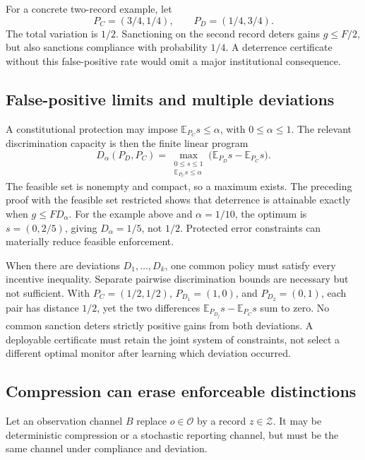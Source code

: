 \documentclass[11pt,letterpaper]{article}
\theoremstyle{plain}
\theoremstyle{definition}
\theoremstyle{remark}
\newcommand{\E}{\mathbb E}
\begin{document}
For a concrete two-record example, let
\[
P_C=(3/4,1/4),\qquad P_D=(1/4,3/4).
\]
The total variation is $1/2$. Sanctioning on the second record deters gains $g\leq F/2$, but also sanctions compliance with probability $1/4$. A deterrence certificate without this false-positive rate would omit a major institutional consequence.

\subsection{False-positive limits and multiple deviations}
A constitutional protection may impose $\E_{P_C}s\leq\alpha$, with $0\leq\alpha\leq1$. The relevant discrimination capacity is then the finite linear program
\begin{equation}\label{eq:protected-discrimination}
D_\alpha(P_D,P_C)=
\max_{\substack{0\leq s\leq1\\\E_{P_C}s\leq\alpha}}
\bigl(\E_{P_D}s-\E_{P_C}s\bigr).
\end{equation}
The feasible set is nonempty and compact, so a maximum exists. The preceding proof with the feasible set restricted shows that deterrence is attainable exactly when $g\leq F D_\alpha$. For the example above and $\alpha=1/10$, the optimum is $s=(0,2/5)$, giving $D_\alpha=1/5$, not $1/2$. Protected error constraints can materially reduce feasible enforcement.

When there are deviations $D_1,\ldots,D_k$, one common policy must satisfy every incentive inequality. Separate pairwise discrimination bounds are necessary but not sufficient. With $P_C=(1/2,1/2)$, $P_{D_1}=(1,0)$, and $P_{D_2}=(0,1)$, each pair has distance $1/2$, yet the two differences $\E_{P_{D_j}}s-\E_{P_C}s$ sum to zero. No common sanction deters strictly positive gains from both deviations. A deployable certificate must retain the joint system of constraints, not select a different optimal monitor after learning which deviation occurred.

\subsection{Compression can erase enforceable distinctions}
Let an observation channel $B$ replace $o\in\mathcal O$ by a record $z\in\mathcal Z$. It may be deterministic compression or a stochastic reporting channel, but must be the same channel under compliance and deviation.
\end{document}
